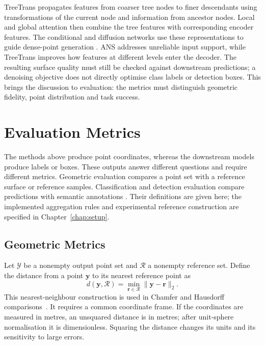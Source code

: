TreeTrans propagates features from coarser tree nodes to finer descendants
using transformations of the current node and information from ancestor
nodes. Local and global attention then combine the tree features with
corresponding encoder features. The conditional and diffusion networks
use these representations to guide dense-point generation
\cite{zhang2025pdans}. ANS addresses unreliable input support, while
TreeTrans improves how features at different levels enter the decoder.
The resulting surface quality must still be checked against downstream
predictions; a denoising objective does not directly optimise class labels
or detection boxes. This brings the discussion to evaluation: the metrics
must distinguish geometric fidelity, point distribution and task success.

\FloatBarrier
\section{Evaluation Metrics}
\label{sec:metrics}

The methods above produce point coordinates, whereas the downstream
models produce labels or boxes. These outputs answer different questions
and require different metrics. Geometric evaluation compares a point set
with a reference surface or reference samples. Classification and detection
evaluation compare predictions with semantic annotations
\cite{qian2021pugcn,shi2019pointrcnn,qi2017pointnet}. Their definitions are
given here; the implemented aggregation rules and experimental reference
construction are specified in Chapter~\ref{chap:setup}.

\subsection{Geometric Metrics}
\label{subsec:metrics_geometric}

Let $\mathcal Y$ be a nonempty output point set and $\mathcal R$ a nonempty
reference set. Define the distance from a point $\mathbf y$ to its nearest
reference point as
\begin{equation}
 d(\mathbf y,\mathcal R)=\min_{\mathbf r\in\mathcal R}
 \|\mathbf y-\mathbf r\|_2.
 \label{eq:nearest_reference}
\end{equation}
This nearest-neighbour construction is used in Chamfer and Hausdorff
comparisons~\cite{qian2021pugcn,fan2017pointsetgen}. It requires a common
coordinate frame. If the coordinates are measured in metres, an unsquared
distance is in metres; after unit-sphere normalisation it is dimensionless.
Squaring the distance changes its units and its sensitivity to large errors.

